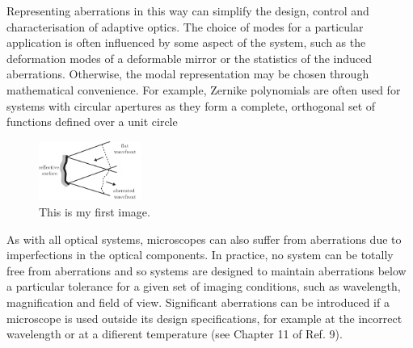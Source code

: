 Representing aberrations in this way can simplify the design, control and characterisation of adaptive optics. The choice of modes for a particular application is often influenced by some aspect of the system, such as the deformation modes of a deformable mirror or the statistics of the induced aberrations. Otherwise, the modal representation may be chosen through mathematical convenience. For example, Zernike polynomials are often used for systems with circular apertures as they form a complete, orthogonal set of functions defined over a unit circle

\begin{figure}[htbp]
	\centering
		\includegraphics[width=0.30\textwidth]{images/wavefront_distortions_reflection.pdf}
	\caption{This is my first image.}
	\label{fig:wavefront_distortions_reflection}
\end{figure}

As with all optical systems, microscopes can also suffer from aberrations due to imperfections in the optical components. In practice, no system can be totally free from aberrations and so systems are designed to maintain aberrations below a particular tolerance for a given set of imaging conditions, such as wavelength, magnification and field of view. Significant aberrations can be introduced if a microscope is used outside its design specifications, for example at the incorrect wavelength or at a difierent temperature (see Chapter 11 of Ref. 9).